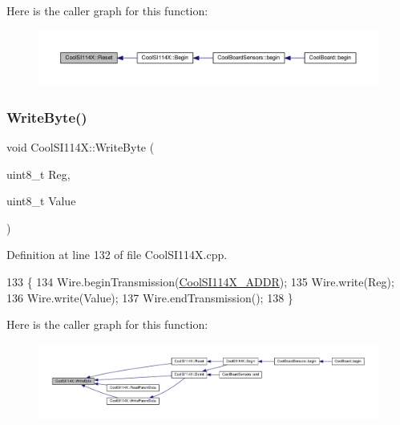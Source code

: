 Here is the caller graph for this function\+:\nopagebreak
\begin{figure}[H]
\begin{center}
\leavevmode
\includegraphics[width=350pt]{dd/d67/class_cool_s_i114_x_a9d9f9c9129c0c29ed497f8563f3dd823_icgraph}
\end{center}
\end{figure}
\mbox{\label{class_cool_s_i114_x_ac5c8dc5ade604da7a1c8cd1586feefc2}} 
\subsubsection{\texorpdfstring{Write\+Byte()}{WriteByte()}}
{\footnotesize\ttfamily void Cool\+S\+I114\+X\+::\+Write\+Byte (\begin{DoxyParamCaption}\item[{uint8\+\_\+t}]{Reg,  }\item[{uint8\+\_\+t}]{Value }\end{DoxyParamCaption})\hspace{0.3cm}{\ttfamily [private]}}



Definition at line 132 of file Cool\+S\+I114\+X.\+cpp.


\begin{DoxyCode}
133 \{
134   Wire.beginTransmission(\hyperlink{_cool_s_i114_x_8h_a1d1122c2b489dc4718053dd79f9760fe}{CoolSI114X\_ADDR}); 
135   Wire.write(Reg); 
136   Wire.write(Value); 
137   Wire.endTransmission(); 
138 \}
\end{DoxyCode}
Here is the caller graph for this function\+:\nopagebreak
\begin{figure}[H]
\begin{center}
\leavevmode
\includegraphics[width=350pt]{dd/d67/class_cool_s_i114_x_ac5c8dc5ade604da7a1c8cd1586feefc2_icgraph}
\end{center}
\end{figure}
\mbox{\label{class_cool_s_i114_x_abf45eb10a6de1be16e68a51624fa2608}} 

